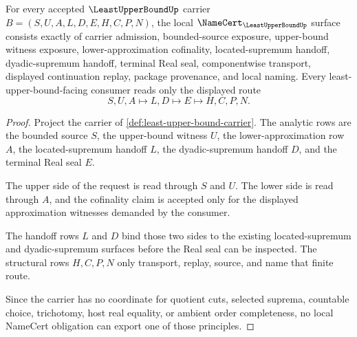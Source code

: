 \begin{theorem}
\label{thm:least-upper-bound-namecert-obligations}
For every accepted $\LeastUpperBoundUp$ carrier $B=(S,U,A,L,D,E,H,C,P,N)$, the local $\NameCert_{\LeastUpperBoundUp}$ surface consists exactly of carrier admission, bounded-source exposure, upper-bound witness exposure, lower-approximation cofinality, located-supremum handoff, dyadic-supremum handoff, terminal Real seal, componentwise transport, displayed continuation replay, package provenance, and local naming. Every least-upper-bound-facing consumer reads only the displayed route
$$
S,U,A\longmapsto L,D\longmapsto E\longmapsto H,C,P,N.
$$
\end{theorem}
\begin{proof}
Project the carrier of \autoref{def:least-upper-bound-carrier}. The analytic rows are the bounded source $S$, the upper-bound witness $U$, the lower-approximation row $A$, the located-supremum handoff $L$, the dyadic-supremum handoff $D$, and the terminal Real seal $E$.

The upper side of the request is read through $S$ and $U$. The lower side is read through $A$, and the cofinality claim is accepted only for the displayed approximation witnesses demanded by the consumer.

The handoff rows $L$ and $D$ bind those two sides to the existing located-supremum and dyadic-supremum surfaces before the Real seal can be inspected. The structural rows $H,C,P,N$ only transport, replay, source, and name that finite route.

Since the carrier has no coordinate for quotient cuts, selected suprema, countable choice, trichotomy, host real equality, or ambient order completeness, no local NameCert obligation can export one of those principles.
\end{proof}

